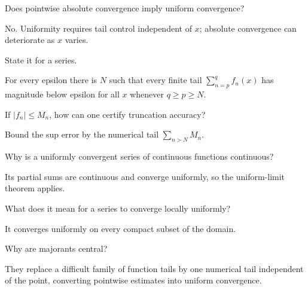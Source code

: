 \begin{problem}\label{prob:ii13-problem-07}
Does pointwise absolute convergence imply uniform convergence?
\end{problem}
\begin{solution}
No. Uniformity requires tail control independent of $x$; absolute convergence can deteriorate as $x$ varies.
\end{solution}

\begin{problem}\label{prob:ii13-problem-08}
State it for a series.
\end{problem}
\begin{solution}
For every epsilon there is $N$ such that every finite tail $\sum_{n=p}^qf_n(x)$ has magnitude below epsilon for all $x$ whenever $q\ge p\ge N$.
\end{solution}

\begin{problem}\label{prob:ii13-problem-09}
If $|f_n|\le M_n$, how can one certify truncation accuracy?
\end{problem}
\begin{solution}
Bound the sup error by the numerical tail $\sum_{n>N}M_n$.
\end{solution}

\begin{problem}\label{prob:ii13-problem-10}
Why is a uniformly convergent series of continuous functions continuous?
\end{problem}
\begin{solution}
Its partial sums are continuous and converge uniformly, so the uniform-limit theorem applies.
\end{solution}

\begin{problem}\label{prob:ii13-problem-11}
What does it mean for a series to converge locally uniformly?
\end{problem}
\begin{solution}
It converges uniformly on every compact subset of the domain.
\end{solution}

\begin{problem}\label{prob:ii13-problem-12}
Why are majorants central?
\end{problem}
\begin{solution}
They replace a difficult family of function tails by one numerical tail independent of the point, converting pointwise estimates into uniform convergence.
\end{solution}

